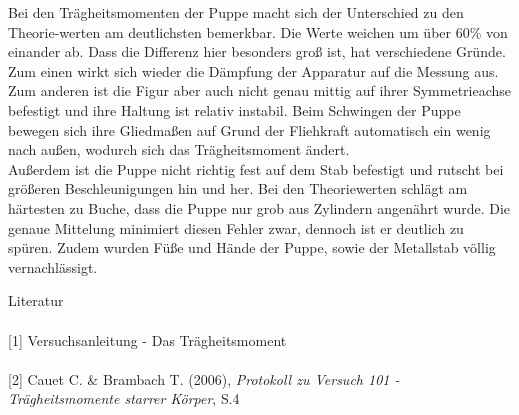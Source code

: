 Bei den Trägheitsmomenten der Puppe macht sich der Unterschied zu den Theorie-werten am deutlichsten bemerkbar. Die Werte weichen um über 60\% von einander ab. Dass die Differenz hier besonders groß ist, hat verschiedene Gründe. Zum einen wirkt sich wieder die Dämpfung der Apparatur auf die Messung aus. Zum anderen ist die Figur aber auch nicht genau mittig auf ihrer Symmetrieachse befestigt und ihre Haltung ist relativ instabil. Beim Schwingen der Puppe bewegen sich ihre Gliedmaßen auf Grund der Fliehkraft automatisch ein wenig nach außen, wodurch sich das Trägheitsmoment ändert.\\
Außerdem ist die Puppe nicht richtig fest auf dem Stab befestigt und rutscht bei größeren Beschleunigungen hin und her.
Bei den Theoriewerten schlägt am härtesten zu Buche, dass die Puppe nur grob aus Zylindern angenährt wurde. Die genaue Mittelung minimiert diesen Fehler zwar, dennoch ist er deutlich zu spüren. Zudem wurden Füße und Hände der Puppe, sowie der Metallstab völlig vernachlässigt.


\parskip 80pt
\Large{Literatur}\\\\
\large{[1] Versuchsanleitung - Das Trägheitsmoment}\\\\
\large{[2] Cauet C. \& Brambach T. (2006), \textit{Protokoll zu Versuch 101 - Trägheitsmomente starrer Körper}, S.4}




